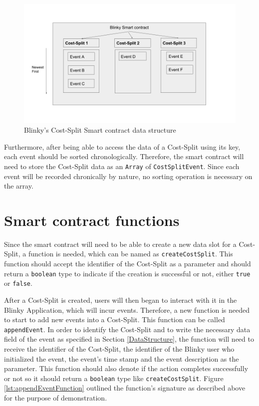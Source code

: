 \documentclass[twoside,numperchapter]{tutthesis} %
\begin{document}
\begin{figure}
    \centering
    \includegraphics[width=\linewidth]{BlinkyCostSplitSmartContractDataStructure.png}
    \caption{Blinky's Cost-Split Smart contract data structure \citep{RefWorks:doc:MasteringBlockchain}}
    \label{fig:smartcontractdatastructure}
\end{figure}


Furthermore, after being able to access the data of a Cost-Split using its key, each event should be sorted chronologically. Therefore, the smart contract will need to store the Cost-Split data as an \texttt{Array} of \texttt{CostSplitEvent}. Since each event will be recorded chronically by nature, no sorting operation is necessary on the array.

\section{Smart contract functions}
\label{section:SmartContractFunctions}

Since the smart contract will need to be able to create a new data slot for a Cost-Split, a function is needed, which can be named as \texttt{createCostSplit}. This function should accept the identifier of the Cost-Split as a parameter and should return a \texttt{boolean} type to indicate if the creation is successful or not, either \texttt{true} or \texttt{false}.

After a Cost-Split is created, users will then began to interact with it in the Blinky Application, which will incur events. Therefore, a new function is needed to start to add new events into a Cost-Split. This function can be called \texttt{appendEvent}. In order to identify the Cost-Split and to write the necessary data field of the event as specified in Section \ref{DataStructure}, the function will need to receive the identifier of the Cost-Split, the identifier of the Blinky user who initialized the event, the event's time stamp and the event description as the parameter. This function should also denote if the action completes successfully or not so it should return a \texttt{boolean} type like \texttt{createCostSplit}. Figure \ref{lst:appendEventFunction} outlined the function's signature as described above for the purpose of demonstration.
\end{document}
